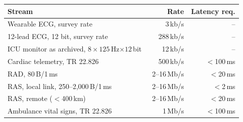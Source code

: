 \begin{tabular}{@{}lrr@{}}\toprule
Stream & Rate & Latency req. \\ \midrule
Wearable ECG, survey rate~\cite{movassaghi2014} & 3\,kb/s & -- \\
12-lead ECG, 12 bit, survey rate~\cite{latre2011} & 288\,kb/s & -- \\
ICU monitor as archived, $8{\times}125$\,Hz${\times}12$\,bit~\cite{mimic3wdb} & 12\,kb/s & -- \\
Cardiac telemetry, TR 22.826~\cite{tr22826} & 500\,kb/s & $<$100\,ms \\
RAD, 80\,B/1\,ms~\cite{ts22104} & 2--16\,Mb/s & $<$20\,ms \\
RAS, local link, 250--2,000\,B/1\,ms~\cite{ts22104} & 2--16\,Mb/s & $<$2\,ms \\
RAS, remote ($<$400\,km)~\cite{ts22104} & 2--16\,Mb/s & $<$20\,ms \\
Ambulance vital signs, TR 22.826~\cite{tr22826} & 1\,Mb/s & $<$100\,ms \\
\bottomrule\end{tabular}

